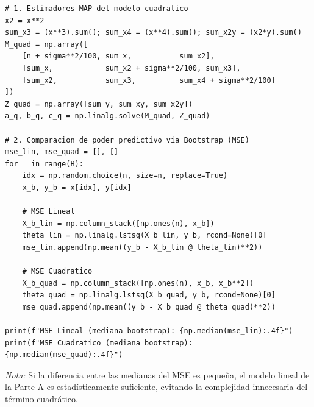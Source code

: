 \documentclass[a4paper]{article}
\begin{document}
\begin{enumerate}[a)]
\begin{lstlisting}
# 1. Estimadores MAP del modelo cuadratico
x2 = x**2
sum_x3 = (x**3).sum(); sum_x4 = (x**4).sum(); sum_x2y = (x2*y).sum()
M_quad = np.array([
    [n + sigma**2/100, sum_x,           sum_x2],
    [sum_x,            sum_x2 + sigma**2/100, sum_x3],
    [sum_x2,           sum_x3,          sum_x4 + sigma**2/100]
])
Z_quad = np.array([sum_y, sum_xy, sum_x2y])
a_q, b_q, c_q = np.linalg.solve(M_quad, Z_quad)

# 2. Comparacion de poder predictivo via Bootstrap (MSE)
mse_lin, mse_quad = [], []
for _ in range(B):
    idx = np.random.choice(n, size=n, replace=True)
    x_b, y_b = x[idx], y[idx]
    
    # MSE Lineal
    X_b_lin = np.column_stack([np.ones(n), x_b])
    theta_lin = np.linalg.lstsq(X_b_lin, y_b, rcond=None)[0]
    mse_lin.append(np.mean((y_b - X_b_lin @ theta_lin)**2))
    
    # MSE Cuadratico
    X_b_quad = np.column_stack([np.ones(n), x_b, x_b**2])
    theta_quad = np.linalg.lstsq(X_b_quad, y_b, rcond=None)[0]
    mse_quad.append(np.mean((y_b - X_b_quad @ theta_quad)**2))

print(f"MSE Lineal (mediana bootstrap): {np.median(mse_lin):.4f}")
print(f"MSE Cuadratico (mediana bootstrap): {np.median(mse_quad):.4f}")
\end{lstlisting}
\textit{Nota:} Si la diferencia entre las medianas del MSE es pequeña, el modelo lineal de la Parte A es estadísticamente suficiente, evitando la complejidad innecesaria del término cuadrático.
\end{enumerate}
\end{document}
